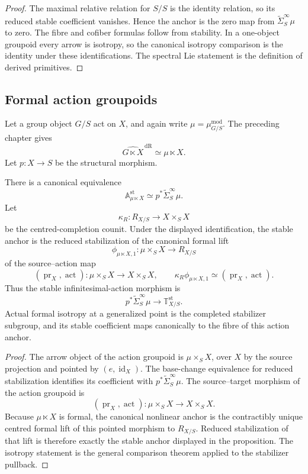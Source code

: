 \begin{proof}
The maximal relative relation for $S/S$ is the identity relation, so its
reduced stable coefficient vanishes.  Hence the anchor is the zero map from
$\widetilde\Sigma^\infty_S\mu$ to zero.  The fibre and cofiber formulas follow
from stability.  In a one-object groupoid every arrow is isotropy, so the
canonical isotropy comparison is the identity under these identifications.
The spectral Lie statement is the definition of derived primitives.
\end{proof}

\subsection{Formal action groupoids}

Let a group object $G/S$ act on $X$, and again write
$\mu=\mu^{\mathrm{mod}}_{G/S}$.  The preceding chapter gives
\[
    \widehat{G\ltimes X}^{\,\mathrm{dR}}
    \simeq
    \mu\ltimes X.
\]
Let $p:X\to S$ be the structural morphism.

\begin{proposition}
\label{prop:bnla-action-stable}
There is a canonical equivalence
\[
    \mathbb A^{\mathrm{st}}_{\mu\ltimes X}
    \simeq
    p^*\widetilde\Sigma^\infty_S\mu.
\]
Let
\[
    \kappa_R:R_{X/S}\longrightarrow X\times_SX
\]
be the centred-completion counit.  Under the displayed identification, the
stable anchor is the reduced stabilization of the canonical formal lift
\[
    \phi_{\mu\ltimes X,1}:
    \mu\times_SX\longrightarrow R_{X/S}
\]
of the source--action map
\[
    (\operatorname{pr}_X,\operatorname{act}):
    \mu\times_SX\longrightarrow X\times_SX,
    \qquad
    \kappa_R\phi_{\mu\ltimes X,1}
    \simeq
    (\operatorname{pr}_X,\operatorname{act}).
\]
Thus the stable infinitesimal-action morphism is
\[
    p^*\widetilde\Sigma^\infty_S\mu
    \longrightarrow
    \mathbb T^{\mathrm{st}}_{X/S}.
\]
Actual formal isotropy at a generalized point is the completed stabilizer
subgroup, and its stable coefficient maps canonically to the fibre of this
action anchor.
\end{proposition}

\begin{proof}
The arrow object of the action groupoid is $\mu\times_SX$, over $X$ by the
source projection and pointed by $(e,\operatorname{id}_X)$.  The base-change
equivalence for reduced stabilization identifies its coefficient with
$p^*\widetilde\Sigma^\infty_S\mu$.  The source--target morphism of the action
groupoid is
\[
    (\operatorname{pr}_X,\operatorname{act}):
    \mu\times_SX\longrightarrow X\times_SX.
\]
Because $\mu\ltimes X$ is formal, the canonical nonlinear anchor is the
contractibly unique centred formal lift of this pointed morphism to
$R_{X/S}$.  Reduced stabilization of that lift is therefore exactly the
stable anchor displayed in the proposition.  The isotropy statement is the
general comparison theorem applied to the stabilizer pullback.
\end{proof}


